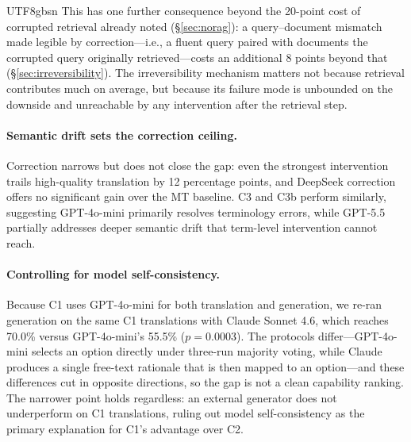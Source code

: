 \documentclass[11pt]{article}
\begin{document}
\begin{CJK}{UTF8}{gbsn}
This has one further consequence beyond the 20-point cost of corrupted retrieval already noted (\S\ref{sec:norag}): a query--document mismatch made legible by correction---i.e., a fluent query paired with documents the corrupted query originally retrieved---costs an additional 8 points beyond that (\S\ref{sec:irreversibility}). The irreversibility mechanism matters not because retrieval contributes much on average, but because its failure mode is unbounded on the downside and unreachable by any intervention after the retrieval step.


\paragraph{Semantic drift sets the correction ceiling.}
Correction narrows but does not close the gap: even the strongest intervention trails high-quality translation by 12 percentage points, and DeepSeek correction offers no significant gain over the MT baseline. C3 and C3b perform similarly, suggesting GPT-4o-mini primarily resolves terminology errors, while GPT-5.5 partially addresses deeper semantic drift that term-level intervention cannot reach.

\paragraph{Controlling for model self-consistency.}
Because C1 uses GPT-4o-mini for both translation and generation, we
re-ran generation on the same C1 translations with Claude Sonnet 4.6,
which reaches 70.0\% versus GPT-4o-mini's 55.5\% ($p = 0.0003$). The
protocols differ---GPT-4o-mini selects an option directly under
three-run majority voting, while Claude produces a single free-text
rationale that is then mapped to an option---and these differences cut
in opposite directions, so the gap is not a clean capability ranking.
The narrower point holds regardless: an external generator does not
underperform on C1 translations, ruling out model self-consistency as
the primary explanation for C1's advantage over C2.


\end{CJK}
\end{document}

